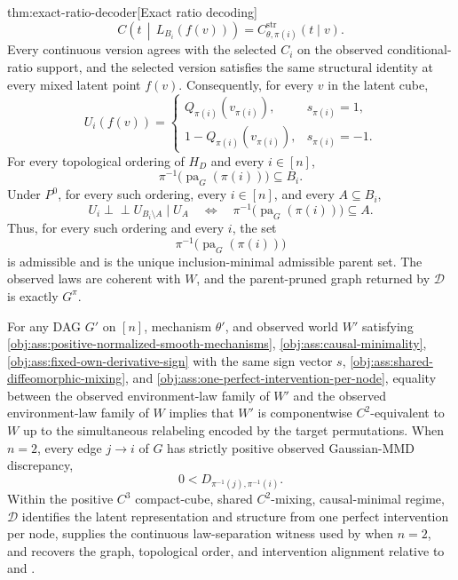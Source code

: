 \documentclass[11pt]{article}
\begin{document}
\begin{theoremv}{thm:exact-ratio-decoder}[Exact ratio decoding]
\[
C\!\left(t\,\middle|\,L_{B_i}(f(v))\right)
=
C_{\theta,\pi(i)}^{\mathrm{str}}(t\mid v).
\]
Every continuous version agrees with the selected \(C_i\) on the observed conditional-ratio support, and the selected version satisfies the same structural identity at every mixed latent point \(f(v)\). Consequently, for every \(v\) in the latent cube,
\[
U_i(f(v))=
\begin{cases}
Q_{\pi(i)}(v_{\pi(i)}), & s_{\pi(i)}=1,\\
1-Q_{\pi(i)}(v_{\pi(i)}), & s_{\pi(i)}=-1.
\end{cases}
\]
For every topological ordering of \(H_D\) and every \(i\in[n]\),
\[
\pi^{-1}\!\bigl(\operatorname{pa}_G(\pi(i))\bigr)\subseteq B_i.
\]
Under \(P^0\), for every such ordering, every \(i\in[n]\), and every \(A\subseteq B_i\),
\[
U_i\perp\!\!\!\perp U_{B_i\setminus A}\mid U_A
\quad\Longleftrightarrow\quad
\pi^{-1}\!\bigl(\operatorname{pa}_G(\pi(i))\bigr)\subseteq A.
\]
Thus, for every such ordering and every \(i\), the set
\[
\pi^{-1}\!\bigl(\operatorname{pa}_G(\pi(i))\bigr)
\]
is admissible and is the unique inclusion-minimal admissible parent set. The observed laws are coherent with \(W\), and the parent-pruned graph returned by \(\mathscr D\) is exactly \(G^\pi\).

For any DAG \(G'\) on \([n]\), mechanism \(\theta'\), and observed world \(W'\) satisfying \cref{obj:ass:positive-normalized-smooth-mechanisms}, \cref{obj:ass:causal-minimality}, \cref{obj:ass:fixed-own-derivative-sign} with the same sign vector \(s\), \cref{obj:ass:shared-diffeomorphic-mixing}, and \cref{obj:ass:one-perfect-intervention-per-node}, equality between the observed environment-law family of \(W'\) and the observed environment-law family of \(W\) implies that \(W'\) is componentwise \(C^2\)-equivalent to \(W\) up to the simultaneous relabeling encoded by the target permutations. When \(n=2\), every edge \(j\to i\) of \(G\) has strictly positive observed Gaussian-MMD discrepancy,
\[
0<D_{\pi^{-1}(j),\pi^{-1}(i)}.
\]
Within the positive \(C^3\) compact-cube, shared \(C^2\)-mixing, causal-minimal regime, \(\mathscr D\) identifies the latent representation and structure from one perfect intervention per node, supplies the continuous law-separation witness used by \citet[Theorem~3.2]{vonKugelgenEtAl2023UnknownInterventions} when \(n=2\), and recovers the graph, topological order, and intervention alignment relative to \citet[Theorem~4.2]{WendongEtAl2023CauCA} and \citet[Corollary~{D}.1]{YaoEtAl2025InvariancePrinciple}.
\end{theoremv}
\end{document}
